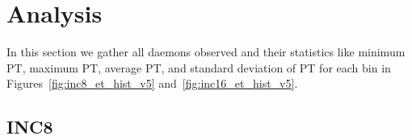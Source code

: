 %

\pagebreak
\section{Analysis~\label{sec:hist_analysis}} 
In this section we gather all daemons observed and their statistics like minimum PT, maximum PT, average PT, and standard deviation of PT for each bin in Figures~\ref{fig:inc8_et_hist_v5} and~\ref{fig:inc16_et_hist_v5}.

\subsection{INC8}

